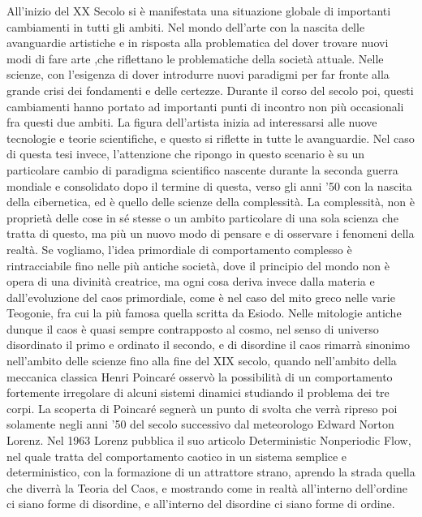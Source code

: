 All'inizio del XX Secolo si è manifestata una situazione globale 
di importanti cambiamenti in tutti gli ambiti.
Nel mondo dell'arte con la nascita delle avanguardie artistiche e
in risposta alla problematica del dover trovare nuovi modi di fare
arte ,che riflettano le problematiche della società attuale.
Nelle scienze, con l'esigenza di dover introdurre nuovi paradigmi
per far fronte alla grande crisi dei fondamenti e delle certezze.
Durante il corso del secolo poi, questi cambiamenti hanno portato 
ad importanti punti di incontro non più occasionali fra questi due ambiti. 
La figura dell'artista inizia ad interessarsi alle nuove tecnologie
e teorie scientifiche, e questo si riflette in tutte le avanguardie.
Nel caso di questa tesi invece, l'attenzione che ripongo in questo scenario 
è su un particolare cambio di paradigma scientifico
nascente durante la seconda guerra mondiale e consolidato
dopo il termine di questa,
verso gli anni '50 con la nascita della cibernetica, 
ed è quello delle scienze della complessità.
La complessità, non è proprietà delle cose in sé stesse o un ambito particolare
di una sola scienza che tratta di questo, 
ma più un nuovo modo di pensare e di osservare i fenomeni 
della realtà.
Se vogliamo, l'idea primordiale di comportamento complesso è rintracciabile fino
nelle più antiche società, dove il principio del mondo non è opera di una divinità creatrice,
ma ogni cosa deriva invece dalla materia e dall’evoluzione del caos primordiale,
come è nel caso del mito greco nelle varie Teogonie, fra cui la più famosa quella scritta da Esiodo.
Nelle mitologie antiche dunque il caos è quasi sempre
contrapposto al cosmo, nel senso di universo disordinato il primo e ordinato
il secondo, e di disordine il caos rimarrà sinonimo nell'ambito delle scienze fino alla fine del XIX secolo, quando nell'ambito della meccanica classica Henri Poincaré osservò la possibilità di un comportamento fortemente irregolare di alcuni sistemi dinamici studiando il problema dei tre corpi. 
La scoperta di Poincaré segnerà un punto di svolta che verrà ripreso poi solamente negli anni '50 del secolo successivo dal meteorologo Edward Norton Lorenz.
Nel 1963 Lorenz pubblica il suo articolo Deterministic Nonperiodic Flow, nel quale tratta del comportamento caotico in un sistema semplice e deterministico, con la formazione di un attrattore strano,
aprendo la strada quella che diverrà la Teoria del Caos, e mostrando come in realtà all'interno dell'ordine ci siano forme di disordine, e all'interno del disordine ci siano forme di ordine.

